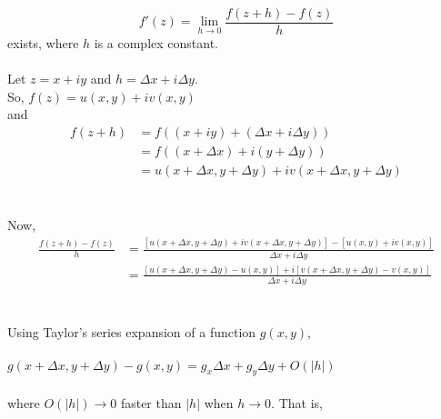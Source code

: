 \documentclass{article}
\begin{document}
\[
f'(z)=\lim_{h\to 0}\frac{f(z+h)-f(z)}{h}
\]
exists, where $h$ is a complex constant.
\\
\\
Let $z=x+iy$ and $h=\Delta x+i\Delta y$.
\\
So, $f(z)=u(x,y)+iv(x,y)$
\\
and \begin{align}
    f(z+h)&=f((x+iy)+(\Delta x+i\Delta y)) \\
    &=f((x+\Delta x)+i(y+\Delta y)) \\
    &=u(x+\Delta x, y+\Delta y)+iv(x+\Delta x, y+\Delta y)
\end{align}
\\
\\
Now, \begin{align}
    \frac{f(z+h)-f(z)}{h} &= \frac{[u(x+\Delta x,y+\Delta y)+iv(x+\Delta x,y+\Delta y)]-[u(x,y)+iv(x,y)]}{\Delta x+i\Delta y} \\
    &=\frac{[u(x+\Delta x,y+\Delta y)-u(x,y)]+i[v(x+\Delta x,y+\Delta y)-v(x,y)]}{\Delta x+i\Delta y}
\end{align}
\\
\\
Using Taylor's series expansion of a function $g(x,y)$,
\\
\\
$g(x+\Delta x,y+\Delta y)-g(x,y)=g_x\Delta x+g_y\Delta y+O(|h|)$
\\
\\ where $O(|h|) \to 0$ faster than $|h|$ when $h\to 0$. That is,
\\
\\
\end{document}
